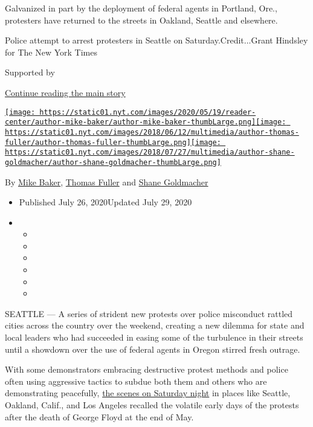 Galvanized in part by the deployment of federal agents in Portland,
Ore., protesters have returned to the streets in Oakland, Seattle and
elsewhere.

Police attempt to arrest protesters in Seattle on
Saturday.Credit...Grant Hindsley for The New York Times

Supported by

\protect\hyperlink{after-sponsor}{Continue reading the main story}

\href{https://www.nytimes.com/by/mike-baker}{\texttt{[image: https://static01.nyt.com/images/2020/05/19/reader-center/author-mike-baker/author-mike-baker-thumbLarge.png]}}\href{https://www.nytimes.com/by/thomas-fuller}{\texttt{[image: https://static01.nyt.com/images/2018/06/12/multimedia/author-thomas-fuller/author-thomas-fuller-thumbLarge.png]}}\href{https://www.nytimes.com/by/shane-goldmacher}{\texttt{[image: https://static01.nyt.com/images/2018/07/27/multimedia/author-shane-goldmacher/author-shane-goldmacher-thumbLarge.png]}}

By \href{https://www.nytimes.com/by/mike-baker}{Mike Baker},
\href{https://www.nytimes.com/by/thomas-fuller}{Thomas Fuller} and
\href{https://www.nytimes.com/by/shane-goldmacher}{Shane Goldmacher}

\begin{itemize}
\item
  Published July 26, 2020Updated July 29, 2020
\item
  \begin{itemize}
  \item
  \item
  \item
  \item
  \item
  \item
  \end{itemize}
\end{itemize}

SEATTLE --- A series of strident new protests over police misconduct
rattled cities across the country over the weekend, creating a new
dilemma for state and local leaders who had succeeded in easing some of
the turbulence in their streets until a showdown over the use of federal
agents in Oregon stirred fresh outrage.

With some demonstrators embracing destructive protest methods and police
often using aggressive tactics to subdue both them and others who are
demonstrating peacefully,
\href{https://www.nytimes.com/2020/07/25/us/protests-seattle-portland.html}{the
scenes on Saturday night} in places like Seattle, Oakland, Calif., and
Los Angeles recalled the volatile early days of the protests after the
death of George Floyd at the end of May.

